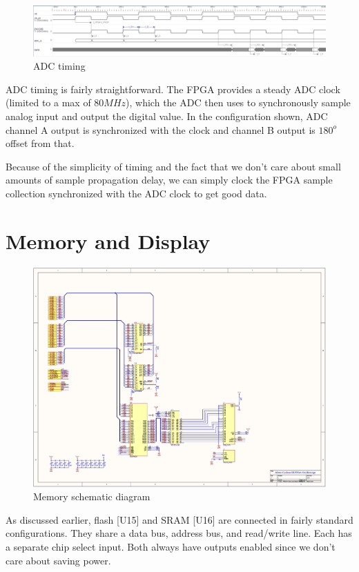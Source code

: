 \begin{figure}[ht!]
    \centering
    \includegraphics[width=6in]{Timing/FPGA-Oscilloscope-ANALOG.png}
		\caption{ADC timing}
\end{figure}

ADC timing is fairly straightforward. The FPGA provides a steady ADC clock (limited to a max of $80MHz$), which the ADC then uses to synchronously sample analog input and output the digital value. In the configuration shown, ADC channel A output is synchronized with the clock and channel B output is $180^o$ offset from that.

Because of the simplicity of timing and the fact that we don't care about small amounts of sample propagation delay, we can simply clock the FPGA sample collection synchronized with the ADC clock to get good data.

\section{Memory and Display}

\begin{figure}[ht!]
    \centering
    \includegraphics[width=6in]{circuit/memory.png}
		\caption{Memory schematic diagram}
\end{figure}

As discussed earlier, flash [U15] and SRAM [U16] are connected in fairly standard configurations. They share a data bus, address bus, and read/write line. Each has a separate chip select input. Both always have outputs enabled since we don't care about saving power.

